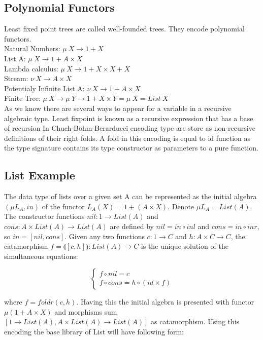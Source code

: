 \documentclass{article}
\begin{document}
\newpage
\subsection{Polynomial Functors}
Least fixed point trees are called well-founded trees.
They encode polynomial functors.\\

\noindent Natural Numbers: $\mu\ X \rightarrow 1 + X$\\
List A: $\mu\ X \rightarrow 1 + A \times X$\\
Lambda calculus: $\mu\ X \rightarrow 1 + X \times X + X$\\
Stream: $\nu\ X \rightarrow A \times X$\\
Potentialy Infinite List A: $\nu\ X \rightarrow 1 + A \times X$\\
Finite Tree: $\mu\ X \rightarrow \mu\ Y \rightarrow 1 + X \times Y = \mu\ X = List\ X$\\

As we know there are several ways to appear for a variable in a recursive algebraic type.
Least fixpoint is known as a recursive expression that has a base of recursion In Chuch-Bohm-Berarducci encoding type are store as non-recursive definitions of their right folds.
A fold in this encoding is equal to id function as the type signature contains its type constructor as parameters to a pure function.

\subsection{List Example}
The data type of lists over a given set A can be represented as the initial algebra
$(\mu L_A, in)$ of the functor $L_A(X) = 1 + (A \times X)$. Denote $\mu L_A = List(A)$.
The constructor functions $nil: 1 \rightarrow List(A)$ and
$cons: A \times List(A) \rightarrow List(A)$ are defined by
$nil = in \circ inl$ and $cons = in \circ inr$, so $in = [nil,cons]$.
Given any two functions $c: 1 \rightarrow C$ and $h: A \times C \rightarrow C$,
the catamorphism $f = \llparenthesis [c,h] \rrparenthesis : List(A) \rightarrow C$
is the unique solution of the simultaneous equations:

$$
\begin{cases}
  f \circ nil  = c \\
  f \circ cons = h \circ (id \times f)
\end{cases}
$$

where $f = foldr(c,h)$. Having this the initial algebra is presented with functor
$\mu (1 + A \times X)$ and morphisms sum $[1 \rightarrow List(A), A \times List(A) \rightarrow List(A)]$
as catamorphism. Using this encoding the base library of List will have following form:
\end{document}
